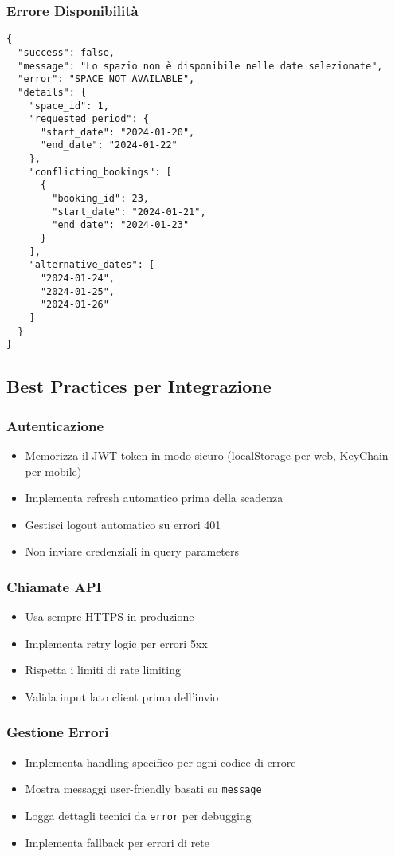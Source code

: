 \subsubsection{Errore Disponibilità}
\begin{lstlisting}[caption=Spazio Non Disponibile]
{
  "success": false,
  "message": "Lo spazio non è disponibile nelle date selezionate",
  "error": "SPACE_NOT_AVAILABLE",
  "details": {
    "space_id": 1,
    "requested_period": {
      "start_date": "2024-01-20",
      "end_date": "2024-01-22"
    },
    "conflicting_bookings": [
      {
        "booking_id": 23,
        "start_date": "2024-01-21",
        "end_date": "2024-01-23"
      }
    ],
    "alternative_dates": [
      "2024-01-24",
      "2024-01-25",
      "2024-01-26"
    ]
  }
}
\end{lstlisting}

\subsection{Best Practices per Integrazione}

\subsubsection{Autenticazione}
\begin{itemize}
    \item Memorizza il JWT token in modo sicuro (localStorage per web, KeyChain per mobile)
    \item Implementa refresh automatico prima della scadenza
    \item Gestisci logout automatico su errori 401
    \item Non inviare credenziali in query parameters
\end{itemize}

\subsubsection{Chiamate API}
\begin{itemize}
    \item Usa sempre HTTPS in produzione
    \item Implementa retry logic per errori 5xx
    \item Rispetta i limiti di rate limiting
    \item Valida input lato client prima dell'invio
\end{itemize}

\subsubsection{Gestione Errori}
\begin{itemize}
    \item Implementa handling specifico per ogni codice di errore
    \item Mostra messaggi user-friendly basati su \texttt{message}
    \item Logga dettagli tecnici da \texttt{error} per debugging
    \item Implementa fallback per errori di rete
\end{itemize}

